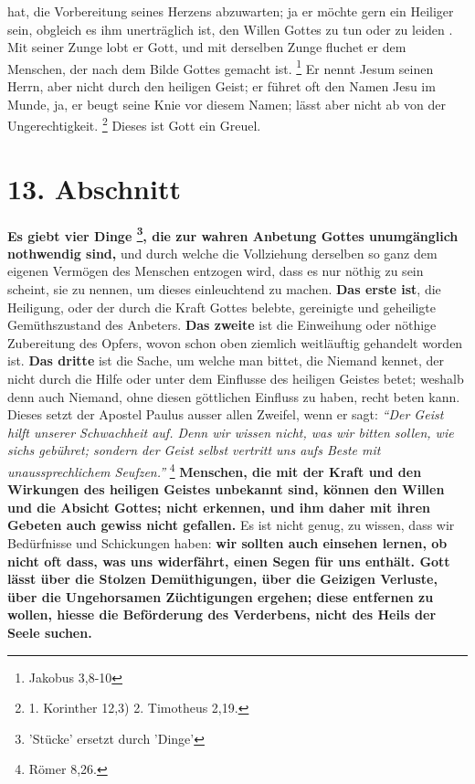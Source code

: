 hat, die
Vorbereitung seines Herzens abzuwarten; ja er möchte gern ein Heiliger
 sein,
obgleich es ihm unerträglich ist, den Willen Gottes zu tun  oder zu leiden . Mit
seiner Zunge lobt er Gott, und mit derselben Zunge fluchet er dem Menschen, der
nach dem Bilde Gottes gemacht ist.
\footnote{Jakobus 3,8-10}
 Er nennt Jesum
seinen Herrn, aber nicht durch den heiligen Geist; er führet oft den Namen
Jesu im Munde, ja, er beugt seine Knie vor diesem Namen; lässt aber nicht ab
von der Ungerechtigkeit. 
\footnote{1. Korinther 12,3) 2. Timotheus 2,19.}
Dieses ist Gott ein 
Greuel.

\section{13. Abschnitt} \label{kap6_ab13}
 \textbf{Es giebt vier Dinge
\footnote{'Stücke' ersetzt durch 'Dinge'}, die zur wahren Anbetung Gottes
unumgänglich
nothwendig
sind,} und durch welche die Vollziehung derselben so ganz dem eigenen Vermögen
des Menschen entzogen wird, dass es nur nöthig zu sein scheint, sie zu nennen,
um dieses einleuchtend zu machen. \textbf{Das erste ist}, die Heiligung, oder
der durch
die Kraft Gottes belebte, gereinigte und geheiligte Gemüthszustand des Anbeters.
\textbf{Das zweite} ist die Einweihung oder nöthige Zubereitung des Opfers,
wovon schon
oben ziemlich weitläuftig gehandelt worden ist. \textbf{Das dritte} ist die
Sache, um
welche man bittet, die Niemand kennet, der nicht durch die Hilfe oder unter dem
Einflusse des heiligen Geistes  betet; weshalb denn auch
Niemand, ohne diesen
göttlichen Einfluss zu haben, recht beten kann. Dieses setzt der Apostel
Paulus ausser allen Zweifel, wenn er sagt:
\textit{"`Der Geist hilft unserer
Schwachheit auf. Denn wir wissen nicht, was wir bitten sollen, wie sichs
gebühret; sondern der Geist selbst vertritt uns  aufs Beste mit
unaussprechlichem Seufzen."'}
\footnote{Römer 8,26.}
\textbf{Menschen, die mit der
Kraft
und den Wirkungen des heiligen Geistes unbekannt sind, können den Willen und die
Absicht Gottes; nicht erkennen, und ihm daher mit ihren Gebeten auch gewiss
nicht gefallen.} Es ist nicht genug, zu wissen, dass wir Bedürfnisse und
Schickungen haben:  \textbf{wir sollten auch einsehen
lernen, ob nicht oft dass,
was uns
widerfährt, einen Segen  für uns enthält. Gott lässt über die
Stolzen
Demüthigungen, über die Geizigen Verluste, über die
Ungehorsamen Züchtigungen
ergehen; diese entfernen zu wollen, hiesse die Beförderung des Verderbens, nicht
des Heils der Seele suchen.}

